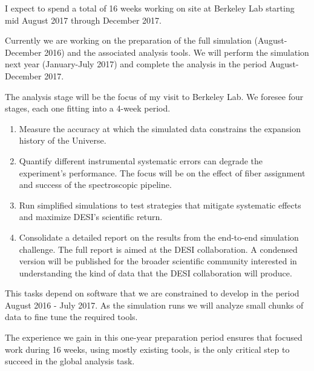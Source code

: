 \documentclass[12pt]{article}
\begin{document}
I expect to spend a total of 16 weeks working on site at Berkeley
Lab starting mid August 2017 through December 2017. 

Currently we are working on the preparation of the full simulation
(August-December 2016) and the associated analysis tools. We will
perform the simulation next year (January-July 2017) and complete the
analysis in the period August-December 2017.  

The analysis stage will be the focus of my visit
to Berkeley Lab.
We foresee four stages, each one fitting into a 4-week period.

\begin{enumerate}
\item Measure the accuracy at which the simulated data constrains the
  expansion history of the Universe.  
\item Quantify different instrumental systematic errors can degrade
  the experiment's performance. The focus will be on the effect of
  fiber assignment and success of the spectroscopic pipeline. 
\item Run simplified simulations to test strategies that mitigate
  systematic effects and maximize DESI's scientific return.
\item Consolidate a detailed report on the results from the end-to-end
  simulation challenge. 
  The full report is aimed at the DESI collaboration. A condensed
  version will be published for the broader scientific community
  interested in understanding the kind of data that the DESI
  collaboration will produce. 
\end{enumerate}

This tasks depend on software that we are constrained to develop in
the period August 2016 - July 2017. As the simulation runs we will
analyze small chunks of data to fine tune the required tools. 

The experience we gain in this one-year preparation period ensures that
focused work during 16 weeks, using mostly existing tools, is the only
critical step to succeed in the global analysis task.
\end{document}
